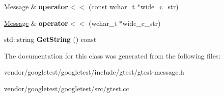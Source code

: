 \begin{DoxyCompactItemize}
\mbox{\hyperlink{classtesting_1_1_message}{Message}} \& {\bfseries operator$<$$<$} (const wchar\+\_\+t $\ast$wide\+\_\+c\+\_\+str)
\item 
\mbox{\label{classtesting_1_1_message_ac1d3a041ac4bb9c929ee746b31a13d6a}} 
\mbox{\hyperlink{classtesting_1_1_message}{Message}} \& {\bfseries operator$<$$<$} (wchar\+\_\+t $\ast$wide\+\_\+c\+\_\+str)
\item 
\mbox{\label{classtesting_1_1_message_a2cdc4df62bdcc9df37651a1cf527704e}} 
std\+::string {\bfseries Get\+String} () const
\end{DoxyCompactItemize}


The documentation for this class was generated from the following files\+:\begin{DoxyCompactItemize}
\item 
vendor/googletest/googletest/include/gtest/gtest-\/message.\+h\item 
vendor/googletest/googletest/src/gtest.\+cc\end{DoxyCompactItemize}
